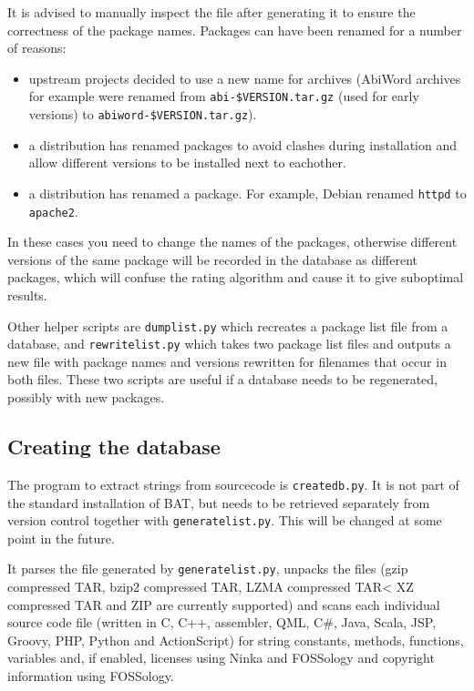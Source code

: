 \documentclass[10pt]{article}
\begin{document}
It is advised to manually inspect the file after generating it to ensure the
correctness of the package names. Packages can have been renamed for a number
of reasons:

\begin{itemize}
\item upstream projects decided to use a new name for archives (AbiWord
archives for example were renamed from \texttt{abi-\$VERSION.tar.gz} (used for
early versions) to \texttt{abiword-\$VERSION.tar.gz}).
\item a distribution has renamed packages to avoid clashes during installation
and allow different versions to be installed next to eachother.
\item a distribution has renamed a package. For example, Debian renamed
\texttt{httpd} to \texttt{apache2}.
\end{itemize}

In these cases you need to change the names of the packages, otherwise
different versions of the same package will be recorded in the database as
different packages, which will confuse the rating algorithm and cause it to
give suboptimal results.

Other helper scripts are \texttt{dumplist.py} which recreates a package list
file from a database, and \texttt{rewritelist.py} which takes two package list
files and outputs a new file with package names and versions rewritten for
filenames that occur in both files. These two scripts are useful if a database
needs to be regenerated, possibly with new packages.

\subsection{Creating the database}

The program to extract strings from sourcecode is \texttt{createdb.py}. It is
not part of the standard installation of BAT, but needs to be retrieved
separately from version control together with \texttt{generatelist.py}. This
will be changed at some point in the future.

It parses the file generated by \texttt{generatelist.py}, unpacks the files
(gzip compressed TAR, bzip2 compressed TAR, LZMA compressed TAR< XZ compressed
TAR and ZIP are currently supported) and scans each individual source code file
(written in C, C++, assembler, QML, C\#, Java, Scala, JSP, Groovy, PHP, Python
and ActionScript) for string constants, methods, functions, variables and, if
enabled, licenses using Ninka and FOSSology and copyright information using
FOSSology.
\end{document}
